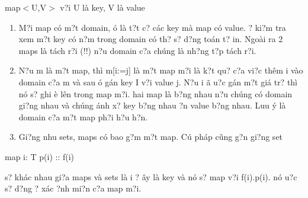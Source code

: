 \documentclass{article} %
\begin{document}
\noindent map$<$U,V$>$  v?i U l\`{a} key, V l\`{a} value

\begin{enumerate}
\item  M?i map c\'{o} m?t domain, {\dj}\'{o} l\`{a} t?t c? c\'{a}c key m\`{a} map c\'{o} value. {\DJ}? ki?m tra xem m?t key c\'{o} n?m trong domain c\'{o} th? s? d?ng to\'{a}n t? in. Ngo\`{a}i ra 2 maps l\`{a} t\'{a}ch r?i (!!) n?u domain c?a ch\'{u}ng l\`{a} nh?ng t?p t\'{a}ch r?i.

\item  N?u m l\`{a} m?t map, th\`{i}  m[i:=j] l\`{a} m?t map m?i l\`{a} k?t qu? c?a vi?c th\^{e}m i v\`{a}o domain c?a m v\`{a} sau {\dj}\'{o} g\'{a}n key I v?i value j. N?u i {\dj}\~{a} {\dj}u?c g\'{a}n m?t gi\'{a} tr? th\`{i} n\'{o} s? ghi {\dj}\`{e} l\^{e}n trong map m?i. hai map l\`{a} b?ng nhau n?u ch\'{u}ng c\'{o} domain gi?ng nhau v\`{a} ch\'{u}ng \'{a}nh x? key b?ng nhau {\dj}?n value b?ng nhau. Luu \'{y} l\`{a} domain c?a m?t map ph?i h?u h?n.

\item  Gi?ng nhu sets, maps c\'{o} bao g?m m?t map. C\'{u} ph\'{a}p c\~{u}ng g?n gi?ng set
\end{enumerate}

\noindent map i: T {\textbar} p(i) :: f(i)

s? kh\'{a}c nhau gi?a maps v\`{a} sets l\`{a} i ? {\dj}\^{a}y l\`{a} key v\`{a} n\'{o} s? map v?i f(i).p(i). n\'{o} {\dj}u?c s? d?ng {\dj}? x\'{a}c {\dj}?nh mi?n c?a map m?i.
\end{document}
